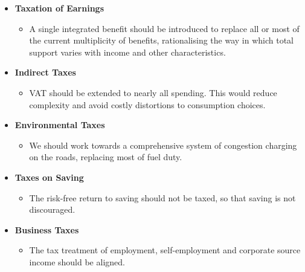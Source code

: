 \begin{frame}
	\begin{itemize}\setlength\itemsep{1em}
		\item \textbf{Taxation of Earnings}\medskip
		\begin{itemize}\setlength\itemsep{1em}
			\item A single integrated benefit should be introduced to replace all or most of the current multiplicity of benefits, rationalising the way in which total support varies with income and other characteristics.
		\end{itemize}
		\item \textbf{Indirect Taxes}\medskip
		\begin{itemize}\setlength\itemsep{1em}
			\item VAT should be extended to nearly all spending. This would reduce complexity and avoid costly distortions to consumption choices.
		\end{itemize}
	\end{itemize}  
\end{frame}
\begin{frame}
	\begin{itemize}\setlength\itemsep{1em}
		\item \textbf{Environmental Taxes}\medskip
		\begin{itemize}\setlength\itemsep{1em}
			\item We should work towards a comprehensive system of congestion charging on the roads, replacing most of fuel duty.
		\end{itemize}
		\item \textbf{Taxes on Saving}\medskip
		\begin{itemize}\setlength\itemsep{1em}
			\item The risk-free return to saving should not be taxed, so that saving is not discouraged.
		\end{itemize}
		\item \textbf{Business Taxes}\medskip
		\begin{itemize}\setlength\itemsep{1em}
			\item The tax treatment of employment, self-employment and corporate source income should be aligned.
		\end{itemize}
	\end{itemize}
\end{frame}